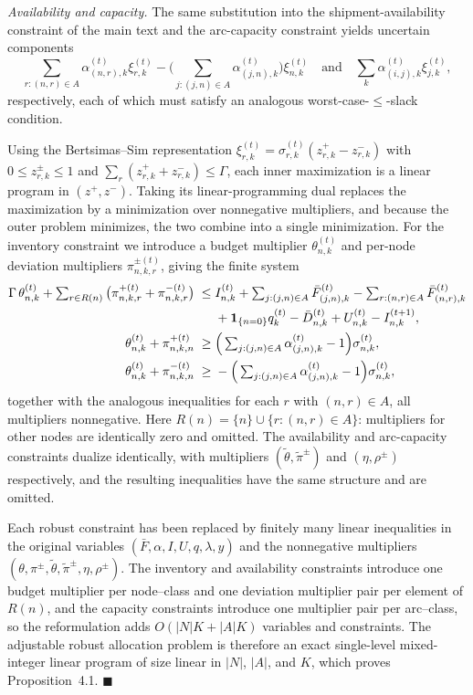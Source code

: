 \documentclass[11pt]{article}
\begin{document}
\emph{Availability and capacity.}
The same substitution into the shipment-availability constraint of the main text and the arc-capacity constraint yields uncertain components
\begin{equation}
\textstyle\sum_{r:(n,r)\in A}\alpha_{(n,r),k}^{(t)}\xi_{r,k}^{(t)} - \Big(\sum_{j:(j,n)\in A}\alpha_{(j,n),k}^{(t)}\Big)\xi_{n,k}^{(t)}
\quad\text{and}\quad
\textstyle\sum_{k}\alpha_{(i,j),k}^{(t)}\xi_{j,k}^{(t)},
\end{equation}
respectively, each of which must satisfy an analogous worst-case-$\le$-slack condition.

Using the Bertsimas--Sim representation $\xi_{r,k}^{(t)} = \sigma_{r,k}^{(t)}(z_{r,k}^{+} - z_{r,k}^{-})$ with $0 \le z_{r,k}^{\pm}\le 1$ and $\sum_r (z_{r,k}^{+}+z_{r,k}^{-})\le\Gamma$, each inner maximization is a linear program in $(z^{+},z^{-})$.
Taking its linear-programming dual replaces the maximization by a minimization over nonnegative multipliers, and because the outer problem minimizes, the two combine into a single minimization.
For the inventory constraint we introduce a budget multiplier $\theta_{n,k}^{(t)}$ and per-node deviation multipliers $\pi_{n,k,r}^{\pm(t)}$, giving the finite system
\begin{align}
\Gamma\,\theta_{n,k}^{(t)} + \textstyle\sum_{r\in R(n)}\big(\pi_{n,k,r}^{+(t)}+\pi_{n,k,r}^{-(t)}\big)
\;\le\;& I_{n,k}^{(t)}
+ \textstyle\sum_{j:(j,n)\in A}\bar F_{(j,n),k}^{(t)}
- \sum_{r:(n,r)\in A}\bar F_{(n,r),k}^{(t)} \notag\\
& + \mathbf{1}_{\{n=0\}}q_k^{(t)} - \bar D_{n,k}^{(t)} + U_{n,k}^{(t)} - I_{n,k}^{(t+1)}, \\
\theta_{n,k}^{(t)} + \pi_{n,k,n}^{+(t)} \;\ge\;& \Big(\textstyle\sum_{j:(j,n)\in A}\alpha_{(j,n),k}^{(t)}-1\Big)\sigma_{n,k}^{(t)}, \\
\theta_{n,k}^{(t)} + \pi_{n,k,n}^{-(t)} \;\ge\;& -\Big(\textstyle\sum_{j:(j,n)\in A}\alpha_{(j,n),k}^{(t)}-1\Big)\sigma_{n,k}^{(t)},
\end{align}
together with the analogous inequalities for each $r$ with $(n,r)\in A$, all multipliers nonnegative.
Here $R(n) = \{n\}\cup\{r : (n,r)\in A\}$: multipliers for other nodes are identically zero and omitted.
The availability and arc-capacity constraints dualize identically, with multipliers $(\tilde\theta,\tilde\pi^{\pm})$ and $(\eta,\rho^{\pm})$ respectively, and the resulting inequalities have the same structure and are omitted.

Each robust constraint has been replaced by finitely many linear inequalities in the original variables $(\bar F,\alpha,I,U,q,\lambda,y)$ and the nonnegative multipliers $(\theta,\pi^{\pm},\tilde\theta,\tilde\pi^{\pm},\eta,\rho^{\pm})$.
The inventory and availability constraints introduce one budget multiplier per node--class and one deviation multiplier pair per element of $R(n)$, and the capacity constraints introduce one multiplier pair per arc--class, so the reformulation adds $O(|N|K + |A|K)$ variables and constraints.
The adjustable robust allocation problem is therefore an exact single-level mixed-integer linear program of size linear in $|N|$, $|A|$, and $K$, which proves Proposition~4.1. \hfill$\blacksquare$
\end{document}
